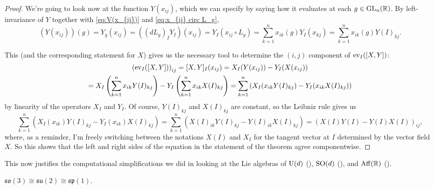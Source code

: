 \begin{proof}
	We're going to look now at the function $Y(x_{ij})$, which we can specify by saying how it evaluates at each $g \in \operatorname{GL}_n(\mathbb{R})$. By left-invariance of $Y$ together with \eqref{eq:V(x_{ij})} and \eqref{eq:x_{ij} circ L_g},
	\[
		\left(Y(x_{ij})\right)(g) = Y_g(x_{ij}) = \left((dL_g)_I Y_I\right)(x_{ij}) = Y_I(x_{ij} \circ L_g) = \sum_{k=1}^n x_{ik}(g)Y_I(x_{kj}) = \sum_{k=1}^n x_{ik}(g) Y(I)_{kj}.
	\]
	
	This (and the corresponding statement for $X$) gives us the necessary tool to determine the $(i,j)$ component of $\operatorname{ev}_I([X,Y])$:
	\begin{multline*}
		\left(\operatorname{ev}_I([X,Y])\right)_{ij} = [X,Y]_I(x_{ij}) = X_I(Y(x_{ij})) - Y_I(X(x_{ij})) \\
		= X_I\left(\sum_{k=1}^n x_{ik}Y(I)_{kj}\right) - Y_I \left(\sum_{k=1}^n x_{ik}X(I)_{kj}\right) = \sum_{k=1}^n \left(X_I(x_{ik} Y(I)_{kj}) - Y_I(x_{ik}X(I)_{kj})\right)
	\end{multline*}
	by linearity of the operators $X_I$ and $Y_I$. Of course, $Y(I)_{kj}$ and $X(I)_{kj}$ are constant, so the Leibniz rule gives us
	\[
		 \sum_{k=1}^n \left(X_I(x_{ik}) Y(I)_{kj} - Y_I(x_{ik})X(I)_{kj}\right) = \sum_{k=1}^n \left(X(I)_{ik} Y(I)_{kj} - Y(I)_{ik}X(I)_{kj}\right) = \left( X(I)Y(I)-Y(I)X(I)\right)_{ij},
	\]
	where, as a reminder, I'm freely switching between the notations $X(I)$ and $X_I$ for the tangent vector at $I$ determined by the vector field $X$. So this shows that the left and right sides of the equation in the statement of the theorem agree componentwise.
\end{proof}

This now justifies the computational simplifications we did in looking at the Lie algebras of $\operatorname{U}(d)$ (), $\operatorname{SO}(d)$ (), and $\operatorname{Aff}(\mathbb{R})$ ().

\begin{proposition}\label{prop:accidental isomorphisms}
	$\mathfrak{so}(3) \cong \mathfrak{su}(2) \cong \mathfrak{sp}(1)$.
\end{proposition}

